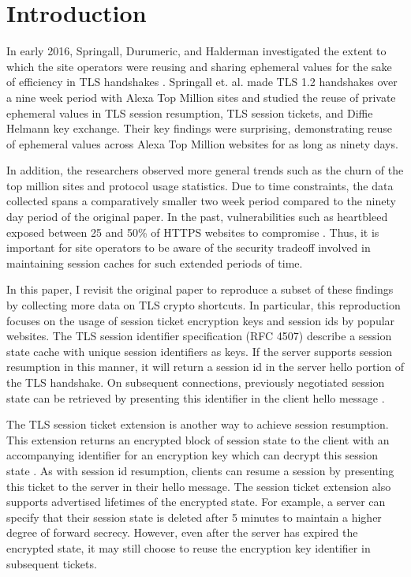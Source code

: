 \section{Introduction}

 In early 2016, Springall, Durumeric, and Halderman investigated the extent to which the site operators were reusing and sharing ephemeral values for the sake of efficiency in TLS handshakes  \cite{Springall:2016:MSH:2987443.2987480}.  Springall et. al. made TLS 1.2 handshakes over a nine week period with Alexa Top Million sites and studied the reuse of private ephemeral values in TLS session resumption, TLS session tickets, and Diffie Helmann key exchange. 
 Their key findings were surprising, demonstrating reuse of ephemeral values across Alexa Top Million websites for as long as ninety days. 

 In addition, the researchers observed more general trends such as the churn of the top million sites and protocol usage statistics. 
 Due to time constraints, the data collected spans a comparatively smaller two week period compared to the ninety day period of the original paper. 
 In the past, vulnerabilities such as heartbleed exposed between 25 and 50\% of HTTPS websites to compromise \cite{Durumeric:2014:MH:2663716.2663755}
. Thus, it is important for site operators to be aware of the security tradeoff involved in maintaining session caches for such extended periods of time. 
 
 In this paper, I revisit the original paper to reproduce a subset of these findings by collecting more data on TLS crypto shortcuts. In particular, this reproduction focuses on the usage of session ticket encryption keys and session ids by popular websites. The TLS session identifier specification (RFC 4507) describe a session state cache with unique session identifiers as keys.
 If the server supports session resumption in this manner, it will return a session id in the server hello portion of the TLS handshake. 
 On subsequent connections, previously negotiated session state can be retrieved by presenting this identifier in the client hello message \cite{RFC4507}.

The TLS session ticket extension is another way to achieve session resumption. This extension returns an encrypted block of session state to the client with an accompanying identifier for an encryption key which can decrypt this session state \cite{RFC5077}. As with session id resumption, clients can resume a session by presenting this ticket to the server in their hello message.  The session ticket extension also supports advertised lifetimes of the encrypted state.  For example, a server can specify that their session state is deleted after 5 minutes to maintain a higher degree of forward secrecy. However, even after the server has expired the encrypted state, it may still choose to reuse the encryption key identifier in subsequent tickets. 

